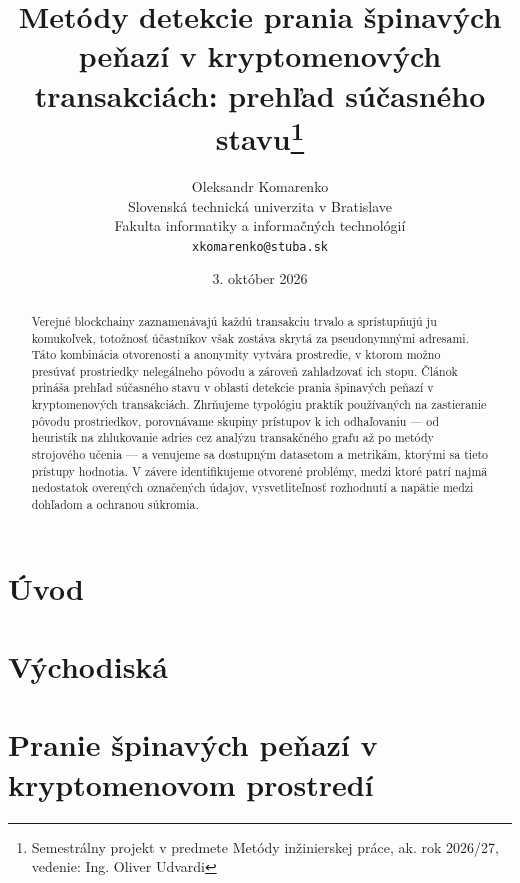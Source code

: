 \documentclass[10pt,twoside,slovak,a4paper]{article}
\title{Metódy detekcie prania špinavých peňazí v kryptomenových
transakciách: prehľad súčasného stavu\thanks{Semestrálny projekt v predmete
Metódy inžinierskej práce, ak. rok 2026/27, vedenie: Ing. Oliver Udvardi}}
\author{Oleksandr Komarenko\\[2pt]
	{\small Slovenská technická univerzita v Bratislave}\\
	{\small Fakulta informatiky a informačných technológií}\\
	{\small \texttt{xkomarenko@stuba.sk}}
	}
\date{\small 3. október 2026}
\begin{document}
\maketitle

\begin{abstract}
Verejné blockchainy zaznamenávajú každú transakciu trvalo a sprístupňujú ju
komukoľvek, totožnosť účastníkov však zostáva skrytá za pseudonymnými adresami.
Táto kombinácia otvorenosti a anonymity vytvára prostredie, v ktorom možno
presúvať prostriedky nelegálneho pôvodu a zároveň zahladzovať ich stopu.
Článok prináša prehľad súčasného stavu v oblasti detekcie prania špinavých
peňazí v kryptomenových transakciách. Zhrňujeme typológiu praktík používaných
na zastieranie pôvodu prostriedkov, porovnávame skupiny prístupov k ich
odhaľovaniu --- od heuristík na zhlukovanie adries cez analýzu transakčného
grafu až po metódy strojového učenia --- a venujeme sa dostupným datasetom
a metrikám, ktorými sa tieto prístupy hodnotia. V závere identifikujeme
otvorené problémy, medzi ktoré patrí najmä nedostatok overených označených
údajov, vysvetliteľnosť rozhodnutí a napätie medzi dohľadom a ochranou
súkromia.
\end{abstract}


\section{Úvod} \label{uvod}



\section{Východiská} \label{vychodiska}



\section{Pranie špinavých peňazí v kryptomenovom prostredí} \label{typologia}
\end{document}
